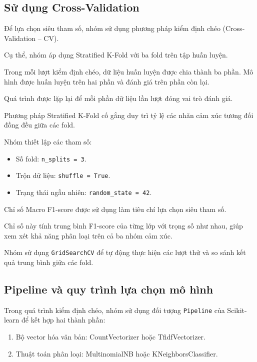\subsection{Sử dụng Cross-Validation}

Để lựa chọn siêu tham số, nhóm sử dụng phương pháp kiểm định chéo (Cross-Validation -- CV).

Cụ thể, nhóm áp dụng Stratified K-Fold với ba fold trên tập huấn luyện.

Trong mỗi lượt kiểm định chéo, dữ liệu huấn luyện được chia thành ba phần. Mô hình được huấn luyện trên hai phần và đánh giá trên phần còn lại.

Quá trình được lặp lại để mỗi phần dữ liệu lần lượt đóng vai trò đánh giá.

Phương pháp Stratified K-Fold cố gắng duy trì tỷ lệ các nhãn cảm xúc tương đối đồng đều giữa các fold.

Nhóm thiết lập các tham số:

\begin{itemize}
    \item Số fold: \texttt{n\_splits = 3}.

    \item Trộn dữ liệu: \texttt{shuffle = True}.

    \item Trạng thái ngẫu nhiên: \texttt{random\_state = 42}.
\end{itemize}

Chỉ số Macro F1-score được sử dụng làm tiêu chí lựa chọn siêu tham số.

Chỉ số này tính trung bình F1-score của từng lớp với trọng số như nhau, giúp xem xét khả năng phân loại trên cả ba nhóm cảm xúc.

Nhóm sử dụng \texttt{GridSearchCV} để tự động thực hiện các lượt thử và so sánh kết quả trung bình giữa các fold.


\subsection{Pipeline và quy trình lựa chọn mô hình}

Trong quá trình kiểm định chéo, nhóm sử dụng đối tượng \texttt{Pipeline} của Scikit-learn để kết hợp hai thành phần:

\begin{enumerate}
    \item Bộ vector hóa văn bản: CountVectorizer hoặc TfidfVectorizer.

    \item Thuật toán phân loại: MultinomialNB hoặc KNeighborsClassifier.
\end{enumerate}

